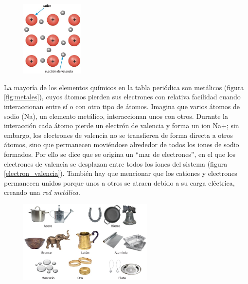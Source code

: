 \documentclass[11pt]{book}
\begin{document}
\begin{figure}
  \centering
  \includegraphics[width=0.28\textwidth]{electron_valencia.jpg}
  \label{fig:electron_valencia}
\end{figure}

La mayoría de los elementos químicos en la tabla periódica son metálicos
(figura \ref{fig:metales}), cuyos átomos pierden sus electrones con relativa facilidad cuando interaccionan
entre sí o con otro tipo de átomos. Imagina que varios átomos de sodio (Na), un elemento metálico, interaccionan
unos con otros. Durante la interacción cada átomo pierde un electrón de valencia y forma un ion Na+; sin embargo,
los electrones de valencia no se transfieren de forma directa a otros átomos, sino que permanecen moviéndose alrededor de todos los iones de sodio formados. Por ello se dice que se origina un “mar de electrones”, en el que los electrones de valencia se desplazan entre todos los iones del sistema (figura \ref{electron_valencia}). También hay que mencionar que los cationes y electrones permanecen unidos porque unos a otros se atraen debido a su carga eléctrica, creando una \emph{red metálica}.


\begin{figure}[H]
  \centering
  \includegraphics[width=0.6\textwidth]{metalicas.jpg}
  \label{fig:metalicas}
\end{figure}
\end{document}
